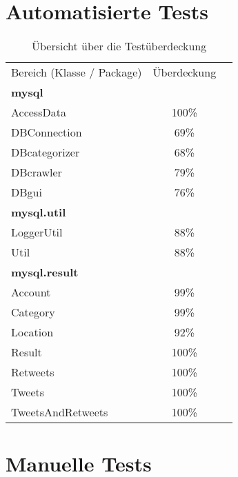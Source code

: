 \section{Automatisierte Tests}

\begin{table}[h]
\begin{tabular} {lcr}
Bereich (Klasse / Package) & Überdeckung \\
	\textbf{mysql} &  \\
		\hspace*{3mm}AccessData & 100\% \\
		\hspace*{3mm}DBConnection & 69\% \\
		\hspace*{3mm}DBcategorizer & 68\% \\
		\hspace*{3mm}DBcrawler & 79\% \\
		\hspace*{3mm}DBgui & 76\% \\
	\textbf{mysql.util} &  \\
		\hspace*{3mm}LoggerUtil & 88\% \\
		\hspace*{3mm}Util & 88\% \\
	\textbf{mysql.result} &  \\
		\hspace*{3mm}Account & 99\% \\
		\hspace*{3mm}Category & 99\% \\
		\hspace*{3mm}Location & 92\% \\
		\hspace*{3mm}Result & 100\% \\
		\hspace*{3mm}Retweets & 100\% \\
		\hspace*{3mm}Tweets & 100\% \\
		\hspace*{3mm}TweetsAndRetweets & 100\% \\
	\end{tabular}
	\caption{Übersicht über die Testüberdeckung}
\end{table}

\section{Manuelle Tests}

